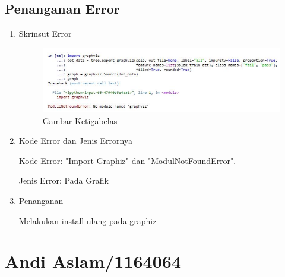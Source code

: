 \subsection{Penanganan Error}
\begin{enumerate}
\item Skrinsut Error
\begin{figure}[!hbtp]
\centering
\includegraphics[scale=0.5]{figures/AIP/jd6.PNG}
\caption{ Gambar Ketigabelas}
\label{6}
\end{figure}
\item Kode Error dan Jenis Errornya
\par Kode Error: "Import Graphiz" dan "ModulNotFoundError". 
\par Jenis Error: Pada Grafik
\item Penanganan
\par Melakukan install ulang pada graphiz

\end{enumerate}



\section{Andi Aslam/1164064}
